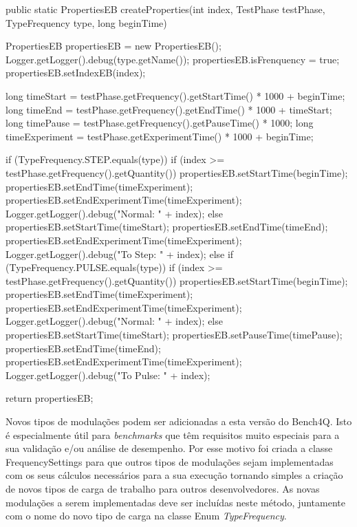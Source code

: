 \begin{codigo}[caption={Algoritmo calcula os tempos de iniciaçização e termino para cada um dos Clientes}, label={code:createProperties}, breaklines=true]
	public static PropertiesEB createProperties(int index, TestPhase testPhase, TypeFrequency type, long beginTime) {
		
		PropertiesEB propertiesEB = new PropertiesEB();
		Logger.getLogger().debug(type.getName());
		propertiesEB.isFrenquency = true;
		propertiesEB.setIndexEB(index);
		
		long timeStart = testPhase.getFrequency().getStartTime() * 1000 + beginTime;
		long timeEnd   = testPhase.getFrequency().getEndTime() * 1000 + timeStart;
		long timePause = testPhase.getFrequency().getPauseTime() * 1000;
		long timeExperiment = testPhase.getExperimentTime() * 1000 + beginTime;
		
		if (TypeFrequency.STEP.equals(type)) {
			if (index >= testPhase.getFrequency().getQuantity()) {
				propertiesEB.setStartTime(beginTime);
				propertiesEB.setEndTime(timeExperiment);
				propertiesEB.setEndExperimentTime(timeExperiment);
				Logger.getLogger().debug("Normal: " + index);
			} else {
			propertiesEB.setStartTime(timeStart);
			propertiesEB.setEndTime(timeEnd);
			propertiesEB.setEndExperimentTime(timeExperiment);
			Logger.getLogger().debug("To Step: " + index);
		}
	} else if (TypeFrequency.PULSE.equals(type)) {
	if (index >= testPhase.getFrequency().getQuantity()) {
		propertiesEB.setStartTime(beginTime);
		propertiesEB.setEndTime(timeExperiment);
		propertiesEB.setEndExperimentTime(timeExperiment);
		Logger.getLogger().debug("Normal: " + index);
	} else {
	propertiesEB.setStartTime(timeStart);
	propertiesEB.setPauseTime(timePause);
	propertiesEB.setEndTime(timeEnd);
	propertiesEB.setEndExperimentTime(timeExperiment);
	Logger.getLogger().debug("To Pulse: " + index);
}
}

return propertiesEB;

}

\end{codigo}

Novos tipos de modulações podem ser adicionadas a esta versão do Bench4Q. Isto é especialmente útil para \textit{benchmarks} que têm requisitos muito especiais para a sua validação e/ou análise de desempenho. Por esse motivo foi criada a classe \textsf{FrequencySettings} para que outros tipos de modulações sejam implementadas com os seus cálculos necessários para a sua execução tornando simples a criação de novos tipos de carga de trabalho para outros desenvolvedores. As novas modulações a serem implementadas deve ser incluídas neste método, juntamente com o nome do novo tipo de carga na classe Enum \textit{TypeFrequency}.

